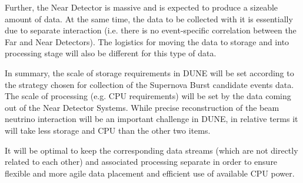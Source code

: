 Further, the Near Detector is massive and is expected to produce a sizeable amount of data. At the same time,
the data to be collected with it is essentially due to separate interaction (i.e. there is no event-specific correlation
between the Far and Near Detectors). The logistics for moving the data to storage and into processing stage
will also be different for this type of data.

In summary, the scale of storage requirements in DUNE will be set according to the strategy chosen for
collection of the Supernova Burst candidate events data. The scale of processing (e.g. CPU requirements)
will be set by the data coming out of the Near Detector Systems. While precise reconstruction of the
beam neutrino interaction will be an important challenge in DUNE, in relative terms it will take less storage
and CPU than the other two items.

It will be optimal to keep the corresponding data streams (which are not directly related to each other) and associated processing
separate in order to ensure flexible and more agile data placement and efficient use of available CPU power.

